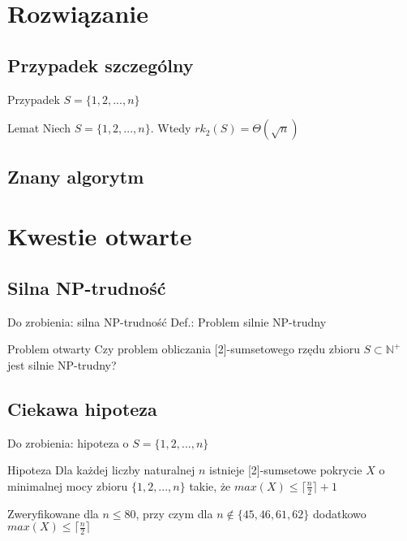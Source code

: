 \documentclass{beamer}
\newcommand{\N}{\mathbb{N}}
\begin{document}
\section{Rozwiązanie}
	\subsection{Przypadek szczególny}
		\begin{frame}{Przypadek $ S = \lbrace 1,2,...,n \rbrace $}
			\begin{exampleblock}{Lemat}			
				Niech $ S = \lbrace 1,2,...,n \rbrace $. Wtedy $ rk_{2}(S) = \Theta(\sqrt{n}) $
			\end{exampleblock}		
		\end{frame}
		
	\subsection{Znany algorytm}
		\begin{frame}
		\end{frame}
		
\section{Kwestie otwarte}
	\subsection{Silna NP-trudność}
		\begin{frame}{Do zrobienia: silna NP-trudność}
			Def.: Problem silnie NP-trudny
			
			\pause
			\begin{alertblock}{Problem otwarty}
				Czy problem obliczania [2]-sumsetowego rzędu zbioru $ S \subset \N^{+} $ jest silnie NP-trudny?
			\end{alertblock}
		\end{frame}
		
	\subsection{Ciekawa hipoteza}
		\begin{frame}{Do zrobienia: hipoteza o $ S = \lbrace 1,2,...,n \rbrace $}
			\begin{alertblock}{Hipoteza}
				Dla każdej liczby naturalnej $ n $ istnieje [2]-sumsetowe pokrycie $ X $ o minimalnej mocy zbioru $ \lbrace 1,2,...,n \rbrace $ takie, że $ max(X) \leq \lceil \frac{n}{2} \rceil + 1 $
			\end{alertblock}
			
			\pause
			Zweryfikowane dla $ n \leq 80 $, przy czym dla $ n \notin \lbrace 45,46,61,62 \rbrace $ dodatkowo $ max(X) \leq \lceil \frac{n}{2} \rceil $
		\end{frame}
\end{document}
